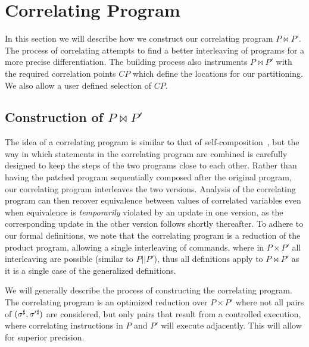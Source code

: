 \section{Correlating Program} 

In this section we will describe how we construct our correlating program $P \bowtie P'$. The process of correlating attempts to find a better interleaving of programs for a more precise differentiation. The building process also instruments $P \bowtie P'$ with the required correlation points $CP$ which define the locations for our partitioning. We also allow a user defined selection of $CP$.

\subsection{Construction of $P \bowtie P'$ }
The idea of a correlating program is similar to that of
self-composition~\cite{AikenTerauchi05}, but the way in
which statements in the correlating program are combined is carefully designed to
keep the steps of the two programs close to each other. Rather than having
the patched program sequentially composed after the original program, our
correlating program interleaves the two versions. Analysis of the correlating program can then recover equivalence between values of correlated variables even when
equivalence is \emph{temporarily} violated by an update in one version, as
the corresponding update in the other version follows shortly thereafter. To adhere to our formal definitions, we note that the correlating program is a reduction of the product program, allowing a single interleaving of commands, where in $P \times P'$ all interleaving are possible (similar to $P||P'$), thus all definitions apply to $P \bowtie P'$ as it is a single case of the generalized definitions.

We will generally describe the process of constructing the correlating program. The correlating program is an optimized reduction over $P \times P'$ where not all pairs of $(\sigma^\sharp,\sigma'^\sharp)$ are considered, but only pairs that result from a controlled execution, where correlating instructions in $P$ and $P'$ will execute adjacently. This will allow for superior precision.

